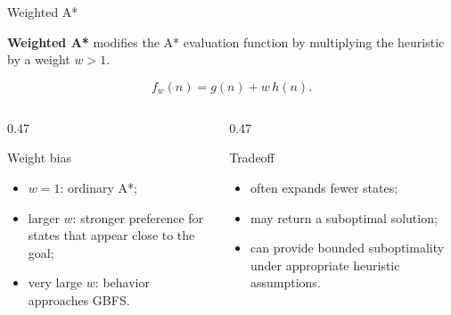 \documentclass[aspectratio=169,10pt]{beamer}
\begin{document}
\begin{frame}[shrink=20]{Weighted A*}
  \begin{cpdefinition}
    \textbf{Weighted A*} modifies the A* evaluation function by multiplying the heuristic by a weight $w>1$.
  \end{cpdefinition}

  \[
    f_w(n)=g(n)+w\,h(n).
  \]

  \begin{columns}[T,onlytextwidth]
    \begin{column}{0.47\textwidth}
      \begin{block}{Weight bias}
        \begin{itemize}
          \item $w=1$: ordinary A*;
          \item larger $w$: stronger preference for states that appear close to the goal;
          \item very large $w$: behavior approaches GBFS.
        \end{itemize}
      \end{block}
    \end{column}

    \begin{column}{0.47\textwidth}
      \begin{block}{Tradeoff}
        \begin{itemize}
          \item often expands fewer states;
          \item may return a suboptimal solution;
          \item can provide bounded suboptimality under appropriate heuristic assumptions.
        \end{itemize}
      \end{block}
    \end{column}
  \end{columns}
\end{frame}
\end{document}
